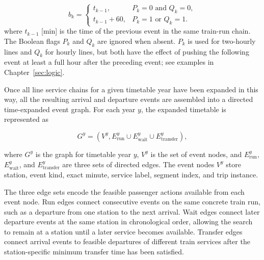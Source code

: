 \documentclass[preprint,12pt]{elsarticle}
\begin{document}
\begin{equation}
  b_k =
  \begin{cases}
    t_{k-1}, & P_k=0 \text{ and } Q_k=0, \\[6pt]
    t_{k-1}+60, & P_k=1 \text{ or } Q_k=1.
  \end{cases}
  \label{eq:continuation-bound}
\end{equation}
where $t_{k-1}$ [min] is the time of the previous event in the same train-run chain. The Boolean flags $P_k$ and $Q_k$ are ignored when absent. $P_k$ is used for two-hourly lines and $Q_k$ for hourly lines, but both have the effect of pushing the following event at least a full hour after the preceding event; see examples in Chapter~\ref{sec:logic}.

Once all line service chains for a given timetable year have been expanded in this way, all the resulting arrival and departure events are assembled into a directed time-expanded event graph. For each year $y$, the expanded timetable is represented as

\begin{equation}
  G^y=(V^y,E^y_{\mathrm{run}}\cup E^y_{\mathrm{wait}}\cup E^y_{\mathrm{transfer}}),
  \label{eq:historical-event-graph}
\end{equation}

where $G^y$ is the graph for timetable year $y$, $V^y$ is the set of event nodes, and $E^y_{\mathrm{run}}$, $E^y_{\mathrm{wait}}$, and $E^y_{\mathrm{transfer}}$ are three sets of directed edges. The event nodes $V^y$ store station, event kind, exact minute, service label, segment index, and trip instance.

The three edge sets encode the feasible passenger actions available from each event node. Run edges connect consecutive events on the same concrete train run, such as a departure from one station to the next arrival. Wait edges connect later departure events at the same station in chronological order, allowing the search to remain at a station until a later service becomes available. Transfer edges connect arrival events to feasible departures of different train services after the station-specific minimum transfer time has been satisfied.
\end{document}
